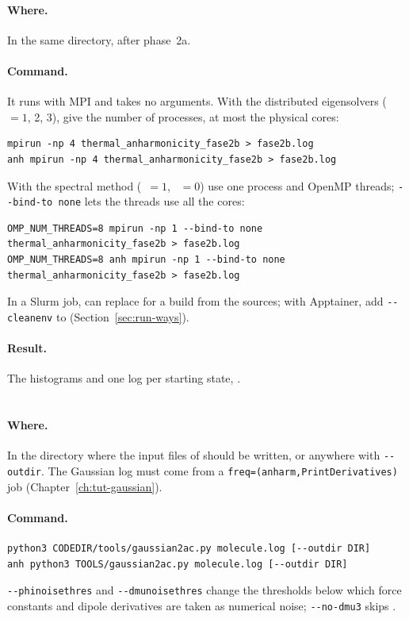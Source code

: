 \paragraph{Where.} In the same directory, after phase~2a.

\paragraph{Command.} It runs with MPI and takes no arguments. With the
distributed eigensolvers (~$=1$, 2, 3), give the number
of processes, at most the physical cores:
\begin{lstlisting}
mpirun -np 4 thermal_anharmonicity_fase2b > fase2b.log
anh mpirun -np 4 thermal_anharmonicity_fase2b > fase2b.log
\end{lstlisting}
With the spectral method (~$=1$, ~$=0$) use
one process and OpenMP threads; \texttt{-{}-bind-to none} lets the threads
use all the cores:
\begin{lstlisting}
OMP_NUM_THREADS=8 mpirun -np 1 --bind-to none thermal_anharmonicity_fase2b > fase2b.log
OMP_NUM_THREADS=8 anh mpirun -np 1 --bind-to none thermal_anharmonicity_fase2b > fase2b.log
\end{lstlisting}
In a Slurm job,  can replace  for a build from
the sources; with Apptainer, add \texttt{-{}-cleanenv} to 
(Section~\ref{sec:run-ways}).

\paragraph{Result.} The histograms  and one log per starting
state, .

\section{}\label{sec:run-gaussian2ac}

\paragraph{Where.} In the directory where the input files of \ac{} should
be written, or anywhere with \texttt{-{}-outdir}. The Gaussian log must come
from a \texttt{freq=(anharm,PrintDerivatives)} job
(Chapter~\ref{ch:tut-gaussian}).

\paragraph{Command.}
\begin{lstlisting}
python3 CODEDIR/tools/gaussian2ac.py molecule.log [--outdir DIR]
anh python3 TOOLS/gaussian2ac.py molecule.log [--outdir DIR]
\end{lstlisting}
\texttt{-{}-phinoisethres} and \texttt{-{}-dmunoisethres} change the
thresholds below which force constants and dipole derivatives are taken
as numerical noise; \texttt{-{}-no-dmu3} skips .

